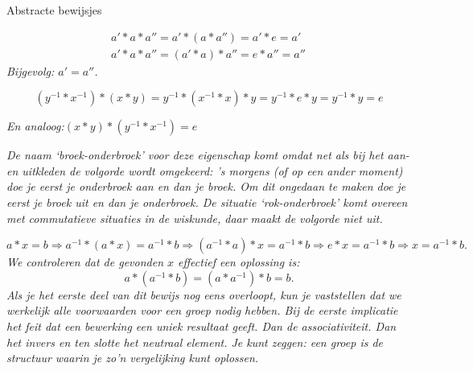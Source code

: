 \begin{lesactiviteit}{Abstracte bewijsjes}
	
\begin{vraagenantwoord}
	
	
	
	
	\begin{align*}
        a'*a*a''=a'*(a*a'')=a'*e=a'\;\;\\
        a'*a*a''=(a'*a)*a''=e*a''=a''
	\end{align*}
	\emph{Bijgevolg: $a'=a''$.}
	    
	
	
	$$(y^{-1}*x^{-1})*(x*y)=y^{-1}*(x^{-1}*x)*y=y^{-1}*e*y=y^{-1}*y=e$$
	
	\emph{En analoog:$(x*y)*(y^{-1}*x^{-1})=e$ }
	
	\emph{De naam `broek-onderbroek' voor deze eigenschap komt omdat net als bij het aan- en uitkleden de volgorde wordt omgekeerd: 's morgens (of op een ander moment) doe je eerst je onderbroek aan en dan je broek. Om dit ongedaan te maken doe je eerst je broek uit en dan je onderbroek. De situatie `rok-onderbroek' komt overeen met commutatieve situaties in de wiskunde, daar maakt de volgorde niet uit.}
	
	
		$$a*x=b\Rightarrow a^{-1}*(a*x)=a^{-1}*b\Rightarrow(a^{-1}*a)*x=a^{-1}*b\Rightarrow e*x=a^{-1}*b\Rightarrow x=a^{-1}*b.$$
		\emph{We controleren dat de gevonden $x$ effectief een oplossing is:}
		$$a*(a^{-1}*b)=(a*a^{-1})*b=b.$$
		\emph{Als je het eerste deel van dit bewijs nog eens overloopt, kun je vaststellen dat we werkelijk alle voorwaarden voor een groep nodig hebben. Bij de eerste implicatie het feit dat een bewerking een uniek resultaat geeft. Dan de associativiteit. Dan het invers en ten slotte het neutraal element. Je kunt zeggen: een groep is de structuur waarin je zo'n vergelijking kunt oplossen.}
	
\end{vraagenantwoord}
	
	
\end{lesactiviteit}
